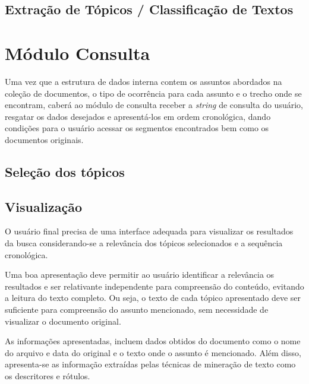 




\subsection{Extração de Tópicos / Classificação de Textos}




\section{Módulo Consulta}

Uma vez que a estrutura de dados interna contem os assuntos abordados na coleção de documentos, o tipo de ocorrência para cada assunto e o trecho onde se encontram, caberá ao módulo de consulta receber a \textit{string} de consulta do usuário, resgatar os dados desejados e apresentá-los em ordem cronológica, dando condições para o usuário acessar os segmentos encontrados bem como os documentos originais.

\subsection{Seleção dos tópicos}

\subsection{Visualização}

O usuário final precisa de uma interface adequada para visualizar os resultados da busca considerando-se a relevância dos tópicos selecionados e a sequência cronológica.

Uma boa apresentação deve permitir ao usuário identificar a relevância os resultados e ser relativante independente para compreensão do conteúdo, evitando a leitura do texto completo. Ou seja, o texto de cada tópico apresentado deve ser suficiente para compreensão do assunto mencionado, sem necessidade de visualizar o documento original.

As informações apresentadas, incluem dados obtidos do documento como o nome do arquivo e data do original e o texto onde o assunto é mencionado. Além disso, apresenta-se as informação extraídas pelas técnicas de mineração de texto como os descritores e rótulos.

